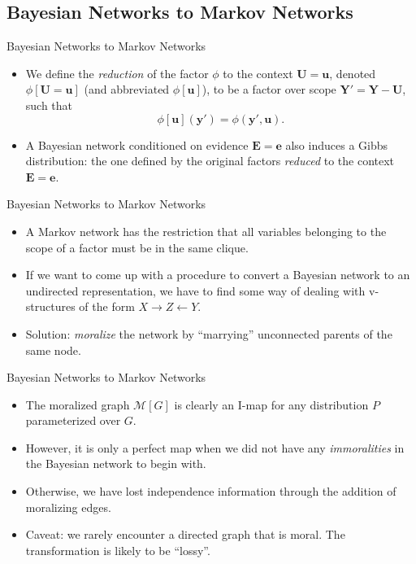 \documentclass[11pt]{beamer}
\begin{document}
\subsection{Bayesian Networks to Markov Networks}

\begin{frame}{Bayesian Networks to Markov Networks}
\begin{itemize}
	\item We define the \emph{reduction} of the factor $\phi$ to the context
	$\boldsymbol{U} = \boldsymbol{u}$, denoted $\phi[\boldsymbol{U} =
	\boldsymbol{u}]$ (and abbreviated $\phi[\boldsymbol{u}]$), to be a
	factor over scope $\boldsymbol{Y}' = \boldsymbol{Y} - \boldsymbol{U}$,
	such that
	\[
		\phi[\boldsymbol{u}](\boldsymbol{y}') = \phi(\boldsymbol{y}',
		\boldsymbol{u}).
	\]
	\item A Bayesian network conditioned on evidence $\boldsymbol{E} =
	\boldsymbol{e}$ also induces a Gibbs distribution: the one defined by
	the original factors \emph{reduced} to the context $\boldsymbol{E} =
	\boldsymbol{e}$.
\end{itemize}
\end{frame}

\begin{frame}{Bayesian Networks to Markov Networks}
\begin{itemize}
	\item A Markov network has the restriction that all variables belonging
	to the scope of a factor must be in the same clique.
	\item If we want to come up with a procedure to convert a Bayesian
	network to an undirected representation, we have to find some way of
	dealing with v-structures of the form $X \rightarrow Z \leftarrow Y$.
	\item Solution: \emph{moralize} the network by ``marrying'' unconnected
	parents of the same node.
\end{itemize}
\end{frame}

\begin{frame}{Bayesian Networks to Markov Networks}
\begin{itemize}
	\item The moralized graph $\mathcal{M}[G]$ is clearly an I-map for
	any distribution $P$ parameterized over $G$.
	\item However, it is only a perfect map when we did not have any
	\emph{immoralities} in the Bayesian network to begin with.
	\item Otherwise, we have lost independence information through the
	addition of moralizing edges.
	\item Caveat: we rarely encounter a directed graph that is moral. The
	transformation is likely to be ``lossy''.
\end{itemize}
\end{frame}
\end{document}
